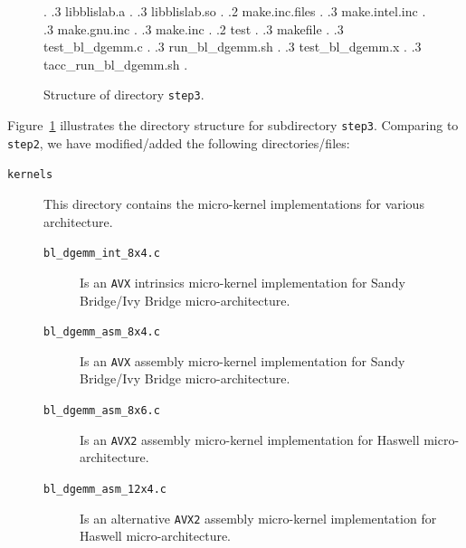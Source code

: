 \begin{figure}[tb!]
\begin{center}
\begin{minipage}{4in}
{%
.
        .3 libblislab.a
.
        .3 libblislab.so
.
		.2 make.inc.files
.
		.3 make.intel.inc 
.
		.3 make.gnu.inc 
.
		.3 make.inc 
.
		.2 test 
.
		.3 makefile 
.
		.3 test\_bl\_dgemm.c 
.
		.3 run\_bl\_dgemm.sh 
.
		.3 test\_bl\_dgemm.x 
.       
		.3 tacc\_run\_bl\_dgemm.sh 
.	
	}
\end{minipage}
\end{center}
\caption{Structure of directory {\tt step3}.}
\label{fig:DirStep1}
\end{figure}

Figure~\ref{fig:DirStep1} illustrates the directory
structure for subdirectory {\tt step3}. Comparing to {\tt step2}, we have modified/added the following directories/files:

\begin{description}
\item[{\tt kernels}] This directory contains the micro-kernel implementations for various architecture.
\begin{description}
\item[{\tt bl\_dgemm\_int\_8x4.c}] Is an {\tt AVX} intrinsics micro-kernel implementation for Sandy Bridge/Ivy Bridge micro-architecture.
\item[{\tt bl\_dgemm\_asm\_8x4.c}] Is an {\tt AVX} assembly micro-kernel implementation for Sandy Bridge/Ivy Bridge micro-architecture.
\item[{\tt bl\_dgemm\_asm\_8x6.c}] Is an {\tt AVX2} assembly micro-kernel implementation for Haswell micro-architecture.
\item[{\tt bl\_dgemm\_asm\_12x4.c}] Is an alternative {\tt AVX2} assembly micro-kernel implementation for Haswell micro-architecture.
\end{description}
\end{description}

